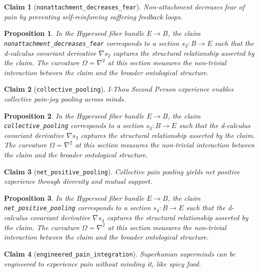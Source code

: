 \documentclass{article}
\newtheorem{claim}{Claim}
\newtheorem{proposition}{Proposition}
\begin{document}
\begin{claim}[\texttt{nonattachment_decreases_fear}]
Non-attachment decreases fear of pain by preventing self-reinforcing suffering feedback loops.
\end{claim}

\begin{proposition}
In the Hyperseed fiber bundle $E \to B$, the claim \texttt{nonattachment_decreases_fear} corresponds to a section $s_2: B \to E$ such that the d-calculus covariant derivative $\nabla s_2$ captures the structural relationship asserted by the claim. The curvature $\Omega = \nabla^2$ at this section measures the non-trivial interaction between the claim and the broader ontological structure.
\end{proposition}

\begin{claim}[\texttt{collective_pooling}]
I-Thou Second Person experience enables collective pain-joy pooling across minds.
\end{claim}

\begin{proposition}
In the Hyperseed fiber bundle $E \to B$, the claim \texttt{collective_pooling} corresponds to a section $s_3: B \to E$ such that the d-calculus covariant derivative $\nabla s_3$ captures the structural relationship asserted by the claim. The curvature $\Omega = \nabla^2$ at this section measures the non-trivial interaction between the claim and the broader ontological structure.
\end{proposition}

\begin{claim}[\texttt{net_positive_pooling}]
Collective pain pooling yields net positive experience through diversity and mutual support.
\end{claim}

\begin{proposition}
In the Hyperseed fiber bundle $E \to B$, the claim \texttt{net_positive_pooling} corresponds to a section $s_4: B \to E$ such that the d-calculus covariant derivative $\nabla s_4$ captures the structural relationship asserted by the claim. The curvature $\Omega = \nabla^2$ at this section measures the non-trivial interaction between the claim and the broader ontological structure.
\end{proposition}

\begin{claim}[\texttt{engineered_pain_integration}]
Superhuman superminds can be engineered to experience pain without minding it, like spicy food.
\end{claim}
\end{document}
